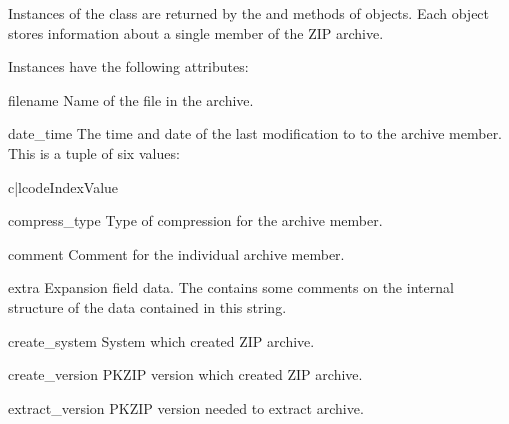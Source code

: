 Instances of the  class are returned by the
 and  methods of
 objects.  Each object stores information about a
single member of the ZIP archive.

Instances have the following attributes:

\begin{memberdesc}[ZipInfo]{filename}
  Name of the file in the archive.
\end{memberdesc}

\begin{memberdesc}[ZipInfo]{date_time}
  The time and date of the last modification to to the archive
  member.  This is a tuple of six values:

\begin{tableii}{c|l}{code}{Index}{Value}
\end{tableii}
\end{memberdesc}

\begin{memberdesc}[ZipInfo]{compress_type}
  Type of compression for the archive member.
\end{memberdesc}

\begin{memberdesc}[ZipInfo]{comment}
  Comment for the individual archive member.
\end{memberdesc}

\begin{memberdesc}[ZipInfo]{extra}
  Expansion field data.  The
   contains some comments on the internal structure of the data
  contained in this string.
\end{memberdesc}

\begin{memberdesc}[ZipInfo]{create_system}
  System which created ZIP archive.
\end{memberdesc}

\begin{memberdesc}[ZipInfo]{create_version}
  PKZIP version which created ZIP archive.
\end{memberdesc}

\begin{memberdesc}[ZipInfo]{extract_version}
  PKZIP version needed to extract archive.
\end{memberdesc}

